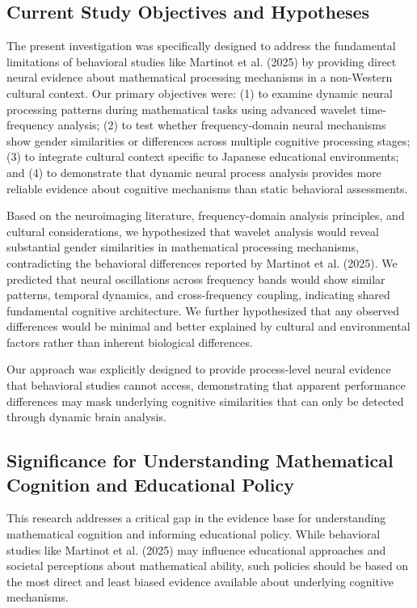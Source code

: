 \documentclass[12pt, a4paper]{article}
\begin{document}
\subsection{Current Study Objectives and Hypotheses}
The present investigation was specifically designed to address the fundamental limitations of behavioral studies like Martinot et al. (2025) by providing direct neural evidence about mathematical processing mechanisms in a non-Western cultural context. Our primary objectives were: (1) to examine dynamic neural processing patterns during mathematical tasks using advanced wavelet time-frequency analysis; (2) to test whether frequency-domain neural mechanisms show gender similarities or differences across multiple cognitive processing stages; (3) to integrate cultural context specific to Japanese educational environments; and (4) to demonstrate that dynamic neural process analysis provides more reliable evidence about cognitive mechanisms than static behavioral assessments.

Based on the neuroimaging literature, frequency-domain analysis principles, and cultural considerations, we hypothesized that wavelet analysis would reveal substantial gender similarities in mathematical processing mechanisms, contradicting the behavioral differences reported by Martinot et al. (2025). We predicted that neural oscillations across frequency bands would show similar patterns, temporal dynamics, and cross-frequency coupling, indicating shared fundamental cognitive architecture. We further hypothesized that any observed differences would be minimal and better explained by cultural and environmental factors rather than inherent biological differences.

Our approach was explicitly designed to provide process-level neural evidence that behavioral studies cannot access, demonstrating that apparent performance differences may mask underlying cognitive similarities that can only be detected through dynamic brain analysis.


\subsection{Significance for Understanding Mathematical Cognition and Educational Policy}
This research addresses a critical gap in the evidence base for understanding mathematical cognition and informing educational policy. While behavioral studies like Martinot et al. (2025) may influence educational approaches and societal perceptions about mathematical ability, such policies should be based on the most direct and least biased evidence available about underlying cognitive mechanisms.
\end{document}
